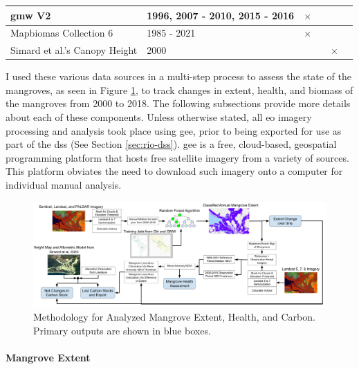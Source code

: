 \begin{table}[!htb]
\begin{center}
\begin{tabular}{| C{3cm} |  C{2cm} | C{1.5cm} | C{1.5cm} | C{1.5cm} | C{2cm} |}
\ac{gmw} V2 & 1996, 2007 - 2010, 2015 - 2016 & \textbf{$\times$} &  & & \cite{buntingGlobalMangroveWatch2018} \\ \hline

Mapbiomas Collection 6 & 1985 - 2021 & \textbf{$\times$} &  & & \cite{raisg-mapbiomasconsortiumMapBiomasAmazoniaProject2021} \\ \hline

Simard et al.'s Canopy Height & 2000 & & & \textbf{$\times$} & \cite{simardMangroveCanopyHeight2019} \\ \hline

\end{tabular}
\end{center}
\end{table}

I used these various data sources in a multi-step process to assess the state of the mangroves, as seen in Figure \ref{fig:extent_method}, to track changes in extent, health, and biomass of the mangroves from 2000 to 2018. The following subsections provide more details about each of these components. Unless otherwise stated, all \ac{eo} imagery processing and analysis took place using \acf{gee}, prior to being exported for use as part of the \ac{dss} (See Section \ref{sec:rio-dss}). \ac{gee} is a free, cloud-based, geospatial programming platform that hosts free satellite imagery from a variety of sources. This platform obviates the need to download such imagery onto a computer for individual manual analysis.

\begin{landscape}
\begin{figure}[t]
	\centering
	\includegraphics[width=1\textwidth]{Figures/chap4/extent_method.png}
	\caption[Mangrove Analysis Methodology]{Methodology for Analyzed Mangrove Extent, Health, and Carbon. Primary outputs are shown in blue boxes.}
	\label{fig:extent_method}
\end{figure}
\end{landscape}

\paragraph{Mangrove Extent} \label{sec:rio-mangrove-extent} \leavevmode\newline

